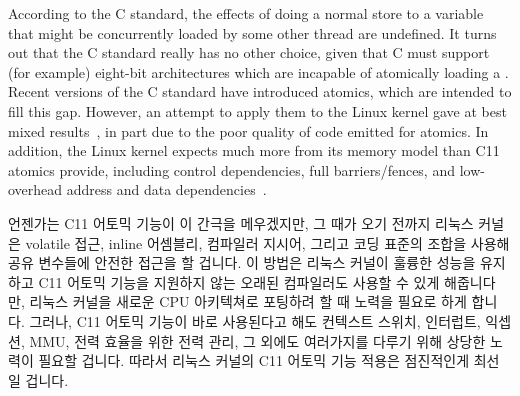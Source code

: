 \begin{lineref}
\begin{lineref}
{	According to the C standard, the effects of doing a normal store
	to a variable that might be concurrently loaded by some other
	thread are undefined.
	It turns out that the C standard really has no other choice,
	given that C must support (for example) eight-bit architectures
	which are incapable of atomically loading a .
	Recent versions of the C standard have introduced atomics, which
	are intended to fill this gap.
	However, an attempt to apply them to the Linux kernel gave
	at best mixed results~\cite{JonathanCorbet2016C11atomics},
	in part due to the poor quality of code emitted for atomics.
	In addition, the Linux kernel expects much more from its
	memory model than C11 atomics provide, including control
	dependencies, full barriers/fences, and low-overhead address
	and data dependencies~\cite{PaulEMcKenney2016P0124R5-LKMM}.
	\fi

	언젠가는 C11 어토믹 기능이 이 간극을 메우겠지만, 그 때가 오기 전까지
	리눅스 커널은 volatile 접근, inline 어셈블리, 컴파일러 지시어, 그리고
	코딩 표준의 조합을 사용해 공유 변수들에 안전한 접근을 할 겁니다.
	이 방법은 리눅스 커널이 훌륭한 성능을 유지하고 C11 어토믹 기능을
	지원하지 않는 오래된 컴파일러도 사용할 수 있게 해줍니다만, 리눅스
	커널을 새로운 CPU 아키텍쳐로 포팅하려 할 때 노력을 필요로 하게 합니다.
	그러나, C11 어토믹 기능이 바로 사용된다고 해도 컨텍스트 스위치,
	인터럽트, 익셉션, MMU, 전력 효율을 위한 전력 관리, 그 외에도 여러가지를
	다루기 위해 상당한 노력이 필요할 겁니다.
	따라서 리눅스 커널의 C11 어토믹 기능 적용은 점진적인게 최선일 겁니다.

}
\end{lineref}
\end{lineref}
